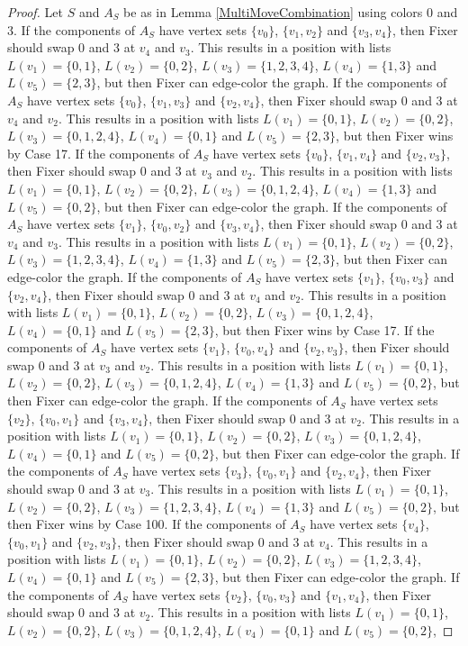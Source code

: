\documentclass[12pt]{amsart}
\theoremstyle{plain}
\theoremstyle{definition}
\theoremstyle{remark}
\begin{document}
\begin{proof}
Let $S$ and $A_S$ be as in Lemma \ref{MultiMoveCombination} using colors $0$ and $3$. If the components of $A_S$ have vertex sets $\{v_0\}$, $\{v_1, v_2\}$ and $\{v_3, v_4\}$, then Fixer should swap 0 and 3 at $v_4$ and $v_3$. This results in a position with lists $L(v_1) = \{0, 1\}$, $L(v_2) = \{0, 2\}$, $L(v_3) = \{1, 2, 3, 4\}$, $L(v_4) = \{1, 3\}$ and $L(v_5) = \{2, 3\}$, but then Fixer can edge-color the graph. If the components of $A_S$ have vertex sets $\{v_0\}$, $\{v_1, v_3\}$ and $\{v_2, v_4\}$, then Fixer should swap 0 and 3 at $v_4$ and $v_2$. This results in a position with lists $L(v_1) = \{0, 1\}$, $L(v_2) = \{0, 2\}$, $L(v_3) = \{0, 1, 2, 4\}$, $L(v_4) = \{0, 1\}$ and $L(v_5) = \{2, 3\}$, but then Fixer wins by Case 17. If the components of $A_S$ have vertex sets $\{v_0\}$, $\{v_1, v_4\}$ and $\{v_2, v_3\}$, then Fixer should swap 0 and 3 at $v_3$ and $v_2$. This results in a position with lists $L(v_1) = \{0, 1\}$, $L(v_2) = \{0, 2\}$, $L(v_3) = \{0, 1, 2, 4\}$, $L(v_4) = \{1, 3\}$ and $L(v_5) = \{0, 2\}$, but then Fixer can edge-color the graph. If the components of $A_S$ have vertex sets $\{v_1\}$, $\{v_0, v_2\}$ and $\{v_3, v_4\}$, then Fixer should swap 0 and 3 at $v_4$ and $v_3$. This results in a position with lists $L(v_1) = \{0, 1\}$, $L(v_2) = \{0, 2\}$, $L(v_3) = \{1, 2, 3, 4\}$, $L(v_4) = \{1, 3\}$ and $L(v_5) = \{2, 3\}$, but then Fixer can edge-color the graph. If the components of $A_S$ have vertex sets $\{v_1\}$, $\{v_0, v_3\}$ and $\{v_2, v_4\}$, then Fixer should swap 0 and 3 at $v_4$ and $v_2$. This results in a position with lists $L(v_1) = \{0, 1\}$, $L(v_2) = \{0, 2\}$, $L(v_3) = \{0, 1, 2, 4\}$, $L(v_4) = \{0, 1\}$ and $L(v_5) = \{2, 3\}$, but then Fixer wins by Case 17. If the components of $A_S$ have vertex sets $\{v_1\}$, $\{v_0, v_4\}$ and $\{v_2, v_3\}$, then Fixer should swap 0 and 3 at $v_3$ and $v_2$. This results in a position with lists $L(v_1) = \{0, 1\}$, $L(v_2) = \{0, 2\}$, $L(v_3) = \{0, 1, 2, 4\}$, $L(v_4) = \{1, 3\}$ and $L(v_5) = \{0, 2\}$, but then Fixer can edge-color the graph. If the components of $A_S$ have vertex sets $\{v_2\}$, $\{v_0, v_1\}$ and $\{v_3, v_4\}$, then Fixer should swap 0 and 3 at $v_2$. This results in a position with lists $L(v_1) = \{0, 1\}$, $L(v_2) = \{0, 2\}$, $L(v_3) = \{0, 1, 2, 4\}$, $L(v_4) = \{0, 1\}$ and $L(v_5) = \{0, 2\}$, but then Fixer can edge-color the graph. If the components of $A_S$ have vertex sets $\{v_3\}$, $\{v_0, v_1\}$ and $\{v_2, v_4\}$, then Fixer should swap 0 and 3 at $v_3$. This results in a position with lists $L(v_1) = \{0, 1\}$, $L(v_2) = \{0, 2\}$, $L(v_3) = \{1, 2, 3, 4\}$, $L(v_4) = \{1, 3\}$ and $L(v_5) = \{0, 2\}$, but then Fixer wins by Case 100. If the components of $A_S$ have vertex sets $\{v_4\}$, $\{v_0, v_1\}$ and $\{v_2, v_3\}$, then Fixer should swap 0 and 3 at $v_4$. This results in a position with lists $L(v_1) = \{0, 1\}$, $L(v_2) = \{0, 2\}$, $L(v_3) = \{1, 2, 3, 4\}$, $L(v_4) = \{0, 1\}$ and $L(v_5) = \{2, 3\}$, but then Fixer can edge-color the graph. If the components of $A_S$ have vertex sets $\{v_2\}$, $\{v_0, v_3\}$ and $\{v_1, v_4\}$, then Fixer should swap 0 and 3 at $v_2$. This results in a position with lists $L(v_1) = \{0, 1\}$, $L(v_2) = \{0, 2\}$, $L(v_3) = \{0, 1, 2, 4\}$, $L(v_4) = \{0, 1\}$ and $L(v_5) = \{0, 2\}$, 
\end{proof}
\end{document}
